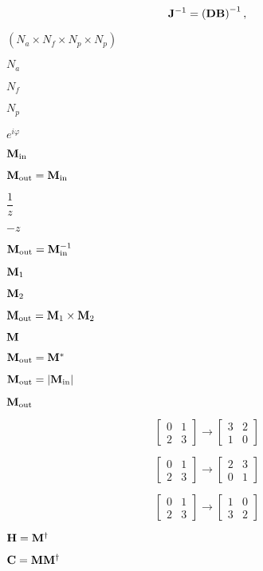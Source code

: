\documentclass{article}
\begin{document}
\[{\bf J}^{-1} = \left({\bf D}{\bf B}\right)^{-1},\]
\pagebreak

$(N_a \times N_f \times N_p \times N_p)$
\pagebreak

$N_a$
\pagebreak

$N_f$
\pagebreak

$N_p$
\pagebreak

$e^{i\varphi}$
\pagebreak

${\bf M}_\text{in}$
\pagebreak

${\bf M}_\text{out} = {\bf M}_\text{in}$
\pagebreak

$\dfrac{1}{z}$
\pagebreak

$-z$
\pagebreak

${\bf M}_\text{out} = {\bf M}_\text{in}^{-1}$
\pagebreak

${\bf M}_1$
\pagebreak

${\bf M}_2$
\pagebreak

${\bf M}_\text{out} = {\bf M}_1 \times {\bf M}_2$
\pagebreak

${\bf M}$
\pagebreak

${\bf M}_\text{out} = {\bf M}^\ast$
\pagebreak

${\bf M}_\text{out} = |{\bf M}_\text{in}|$
\pagebreak

${\bf M}_\text{out}$
\pagebreak

\[\begin{bmatrix} 0 & 1 \\ 2 & 3\end{bmatrix} \rightarrow \begin{bmatrix} 3 & 2 \\ 1 & 0 \end{bmatrix}\]
\pagebreak

\[\begin{bmatrix} 0 & 1 \\ 2 & 3\end{bmatrix} \rightarrow \begin{bmatrix} 2 & 3 \\ 0 & 1 \end{bmatrix}\]
\pagebreak

\[\begin{bmatrix} 0 & 1 \\ 2 & 3\end{bmatrix} \rightarrow \begin{bmatrix} 1 & 0 \\ 3 & 2 \end{bmatrix}\]
\pagebreak

${\bf H} = {\bf M}^\dagger$
\pagebreak

${\bf C} = {\bf M}{\bf M}^\dagger$
\pagebreak
\end{document}

